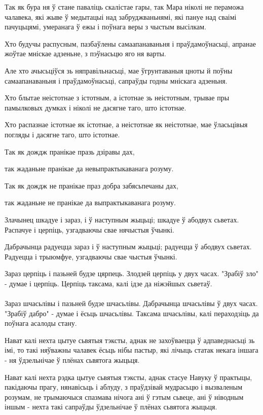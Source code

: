 \documentclass{article}
\begin{document}
Так як бура ня ў стане паваліць скалістае гары, так Мара ніколі не
пераможа чалавека, які жыве ў медытацыі над забруджваньнямі, які пануе
над сваімі пачуцьцямі, умеранага ў ежы і поўнага веры з чыстым высілкам.

Хто будучы распусным, пазбаўлены самаапанаваньня і праўдамоўнасьці,
апранае жоўтае мніскае адзеньне, з пэўнасьцю яго ня варты.

Але хто ачысьціўся зь няправільнасьці, мае ўгрунтаваныя цноты й
поўны самаапанаваньня і праўдамоўнасьці, сапраўды годны мніскага
адзеньня.

Хто блытае неістотнае з істотным, а істотнае зь неістотным, трывае
пры памылковых думках і ніколі не дасягне таго, што істотнае.

Хто распазнае істотнае як істотнае, а неістотнае як неістотнае, мае
ўласьцівыя погляды і дасягне таго, што істотнае.

Так як дождж пранікае празь дзіравы дах,

так жаданьне пранікае да невыпрактыкаванага розуму.

Так як дождж не пранікае праз добра забясьпечаны дах,

так жаданьне не пранікае да выпрактыкаванага розуму.

Злачынец шкадуе і зараз, і ў наступным жыцьці; шкадуе ў абодвух
сьветах. Распачуе і церпіць, узгадваючы свае нячыстыя ўчынкі.

Дабрачынца радуецца зараз і ў наступным жыцьці; радуецца ў абодвух
сьветах. Радуецца і трыюмфуе, узгадваючы свае чыстыя ўчынкі.

Зараз церпіць і пазьней будзе цярпець. Злодзей церпіць у двух часах.
"Зрабіў зло" - думае і церпіць. Церпіць таксама, калі ідзе да ніжэйшых
сьветаў.\\
~\\
Зараз шчасьлівы і пазьней будзе шчасьлівы. Дабрачынца шчасьлівы ў
двух часах. "Зрабіў дабро" - думае і ёсьць шчасьлівы. Таксама шчасьлівы,
калі пераходзіць да поўнага асалоды стану.

Нават калі нехта цытуе сьвятыя тэксты, аднак не захоўваецца ў
адпаведнасьці зь імі, то такі няўважны чалавек ёсьць нібы пастыр, які
лічыць статак некага іншага - ня ўдзельнічае ў плёнах сьвятога жыцьця.

Нават калі нехта рэдка цытуе сьвятыя тэксты, аднак стасуе Навуку ў
практыцы, пакідаючы прагу, нянавісьць і аблуду, з праўдзівай мудрасьцю і
вызваленым розумам, не трымаючыся спазмава нічога ані ў гэтым сьвеце,
ані ў ніводным іншым - нехта такі сапраўды ўдзельнічае ў плёнах сьвятога
жыцьця.
\end{document}
